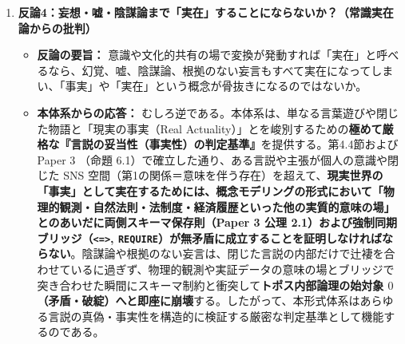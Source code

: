 \documentclass[11pt,a4paper]{ltjsarticle}
\theoremstyle{definition}
\theoremstyle{plain}
\begin{document}
\begin{enumerate}
    \item \textbf{反論4：妄想・嘘・陰謀論まで「実在」することにならないか？（常識実在論からの批判）}
    \begin{itemize}
        \item \textbf{反論の要旨：} 意識や文化的共有の場で変換が発動すれば「実在」と呼べるなら、幻覚、嘘、陰謀論、根拠のない妄言もすべて実在になってしまい、「事実」や「実在」という概念が骨抜きになるのではないか。
        \item \textbf{本体系からの応答：} むしろ逆である。本体系は、単なる言葉遊びや閉じた物語と「現実の事実（Real Actuality）」とを峻別するための\textbf{極めて厳格な『言説の妥当性（事実性）の判定基準』}を提供する。第4.4節および Paper 3 \cite{Ota2026_3}（命題 6.1）で確立した通り、ある言説や主張が個人の意識や閉じた SNS 空間（第1の関係＝意味を伴う存在）を超えて、\textbf{現実世界の「事実」として実在するためには、概念モデリングの形式において「物理的観測・自然法則・法制度・経済履歴といった他の実質的意味の場」とのあいだに両側スキーマ保存則（Paper 3 \cite{Ota2026_3} 公理 2.1）および強制同期ブリッジ（\texttt{<=>}, \texttt{REQUIRE}）が無矛盾に成立することを証明しなければならない}。陰謀論や根拠のない妄言は、閉じた言説の内部だけで辻褄を合わせているに過ぎず、物理的観測や実証データの意味の場とブリッジで突き合わせた瞬間にスキーマ制約と衝突して\textbf{トポス内部論理の始対象 $0$（矛盾・破綻）へと即座に崩壊}する。したがって、本形式体系はあらゆる言説の真偽・事実性を構造的に検証する厳密な判定基準として機能するのである。
    \end{itemize}


\end{enumerate}
\end{document}
